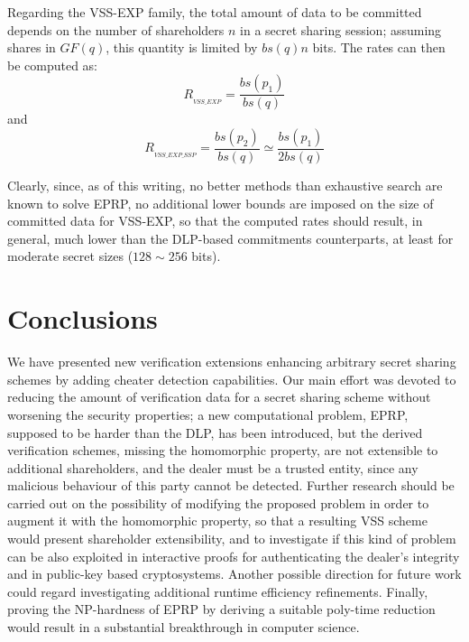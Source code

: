 \documentclass[10pt,journal,cspaper,compsoc]{IEEEtran}
\begin{document}
Regarding the VSS-EXP family, the total amount of data to be committed depends on the number of shareholders $n$ in a secret sharing session; assuming shares in $GF(q)$, this quantity is limited by $bs(q) n$ bits. The rates can then be computed as:
\begin{equation}
R_{_{VSS\_EXP}} = \frac{bs(p_1)}{bs(q)}
\end{equation}
and
\begin{equation}
R_{_{VSS\_EXP\_SSP}} = \frac{bs(p_2)}{bs(q)} \simeq \frac{bs(p_1)}{2 bs(q)}
\end{equation}

Clearly, since, as of this writing, no better methods than exhaustive search are known to solve EPRP, no additional lower bounds are imposed on the size of committed data for VSS-EXP, so that the computed rates should result, in general, much lower than the DLP-based commitments counterparts, at least for moderate secret sizes ($128\sim 256$ bits).


\section{Conclusions}
\label{conclusions-section}
We have presented new verification extensions enhancing arbitrary secret sharing schemes by adding cheater detection capabilities. Our main effort was devoted to reducing the amount of verification data for a secret sharing scheme without worsening the security properties; a new computational problem, EPRP, supposed to be harder than the DLP, has been introduced, but the derived verification schemes, missing the homomorphic property, are not extensible to additional shareholders, and the dealer must be a trusted entity, since any malicious behaviour of this party cannot be detected.
Further research should be carried out on the possibility of modifying the proposed problem in order to augment it with the homomorphic property, so that a resulting VSS scheme would present shareholder extensibility, and to investigate if this kind of problem can be also exploited in interactive proofs for authenticating the dealer's integrity and in public-key based cryptosystems.  Another possible direction for future work could regard investigating additional runtime efficiency refinements. Finally,  proving the NP-hardness of EPRP by deriving a suitable poly-time reduction would result in a substantial breakthrough in computer science.
\end{document}
